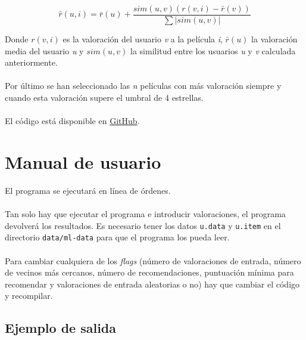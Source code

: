 \[ \hat{r}(u,i) = \bar{r}(u) + \frac{sim(u,v)(r(v,i)-\bar{r}(v))}{\sum|sim(u,v)|} \]

Donde $ r(v,i) $ es la valoración del usuario \textit{v} a la película \textit{i}, $ \bar{r}(u) $ la valoración media del usuario \textit{u} y $ sim(u,v) $ la similitud entre los usuarios \textit{u} y \textit{v} calculada anteriormente.
\\ \\
Por último se han seleccionado las \textit{n} películas con más valoración siempre y cuando esta valoración supere el umbral de 4 estrellas.
\\ \\
El código está disponible en \href{https://github.com/fblupi/master_informatica-GIW/tree/master/P3/InformationRetrievalSystem}{GitHub}.

\section{Manual de usuario}
\label{sec:manual}

El programa se ejecutará en línea de órdenes.
\\ \\
Tan solo hay que ejecutar el programa e introducir valoraciones, el programa devolverá los resultados. Es necesario tener los datos \texttt{u.data} y \texttt{u.item} en el directorio \texttt{data/ml-data} para que el programa los pueda leer.
\\ \\
Para cambiar cualquiera de los \textit{flags} (número de valoraciones de entrada, número de vecinos más cercanos, número de recomendaciones, puntuación mínima para recomendar y valoraciones de entrada aleatorias o no) hay que cambiar el código y recompilar.

\subsection{Ejemplo de salida}

